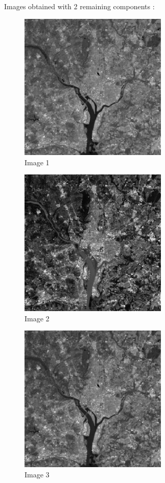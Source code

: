 \documentclass[10pt]{article}
\begin{document}
\clearpage
Images obtained with 2 remaining components :
\begin{figure}[!ht]
	\centering
	\includegraphics[height=200pt]{./ex10/Wash1.jpg}
	\caption{Image 1}
\end{figure}
\begin{figure}[!ht]
	\centering
	\includegraphics[height=200pt]{./ex10/Wash2.jpg}
	\caption{Image 2}
\end{figure}
\begin{figure}[!ht]
	\centering
	\includegraphics[height=200pt]{./ex10/Wash3.jpg}
	\caption{Image 3}
\end{figure}
\end{document}
